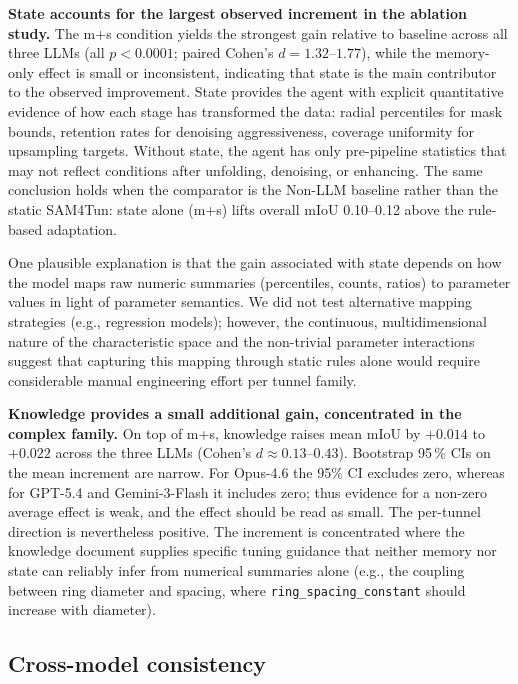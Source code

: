 \documentclass[a4paper,fleqn]{cas-dc}
\begin{document}
{\textbf{State accounts for the largest observed increment in the ablation study.} The m+s condition yields the strongest gain relative to baseline across all three LLMs (all $p < 0.0001$; paired Cohen's $d = 1.32$--$1.77$), while the memory-only effect is small or inconsistent, indicating that state is the main contributor to the observed improvement. State provides the agent with explicit quantitative evidence of how each stage has transformed the data: radial percentiles for mask bounds, retention rates for denoising aggressiveness, coverage uniformity for upsampling targets. Without state, the agent has only pre-pipeline statistics that may not reflect conditions after unfolding, denoising, or enhancing. The same conclusion holds when the comparator is the Non-LLM baseline rather than the static SAM4Tun: state alone (m+s) lifts overall mIoU 0.10--0.12 above the rule-based adaptation.

One plausible explanation is that the gain associated with state depends on how the model maps raw numeric summaries (percentiles, counts, ratios) to parameter values in light of parameter semantics. We did not test alternative mapping strategies (e.g., regression models); however, the continuous, multidimensional nature of the characteristic space and the non-trivial parameter interactions suggest that capturing this mapping through static rules alone would require considerable manual engineering effort per tunnel family.

\textbf{Knowledge provides a small additional gain, concentrated in the complex family.} On top of m+s, knowledge raises mean mIoU by $+0.014$ to $+0.022$ across the three LLMs (Cohen's $d \approx 0.13$--$0.43$). Bootstrap 95\,\% CIs on the mean increment are narrow. For Opus-4.6 the 95\% CI excludes zero, whereas for GPT-5.4 and Gemini-3-Flash it includes zero; thus evidence for a non-zero average effect is weak, and the effect should be read as small. The per-tunnel direction is nevertheless positive. The increment is concentrated where the knowledge document supplies specific tuning guidance that neither memory nor state can reliably infer from numerical summaries alone (e.g., the coupling between ring diameter and spacing, where \texttt{ring\_spacing\_constant} should increase with diameter).

\subsection{Cross-model consistency}\label{sec:consistency}

}
\end{document}
